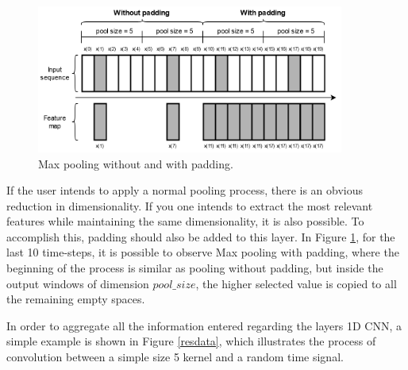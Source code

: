 \begin{figure}[h!]
    \centering
    \begin{center}
    \includegraphics[width=0.9\textwidth]{Images/maxpooling.png}
    \caption{Max pooling without and with padding.}
    \label{maxpooling}
    \end{center}
\end{figure}

If the user intends to apply a normal pooling process, there is an obvious reduction in dimensionality. If you one intends to extract the most relevant features while maintaining the same dimensionality, it is also possible. To accomplish this, padding should also be added to this layer. In Figure \ref{maxpooling}, for the last 10 time-steps, it is possible to observe Max pooling with padding, where the beginning of the process is similar as pooling without padding, but inside the output windows of dimension $pool\_size$, the higher selected value is copied to all the remaining empty spaces. 

In order to aggregate all the information entered regarding the layers {1D CNN}, a simple example is shown in Figure \ref{resdata}, which illustrates the process of convolution between a simple size 5 kernel and a random time signal.


